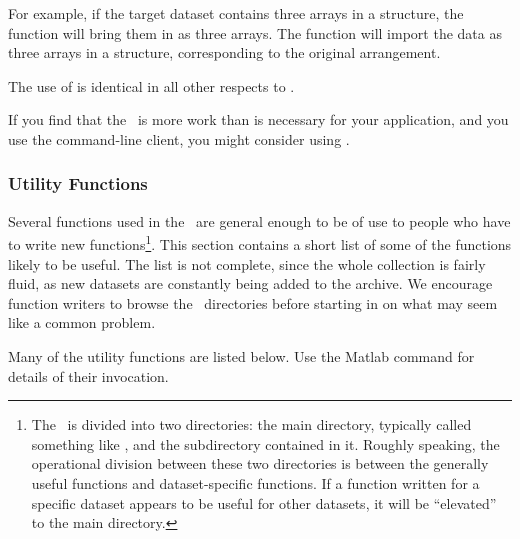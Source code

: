 For example, if the target dataset contains three arrays in a
structure, the  function will bring them in as three
arrays.  The  function will import the data as three
arrays in a structure, corresponding to the original arrangement.

The use of  is identical in all other respects to
.

If you find that the \GUI\ is more work than is necessary for your
application, and you use the command-line client, you might consider
using .


\subsubsection{Utility Functions}

Several functions used in the \GUI\ are general enough to be of use to
people who have to write new  functions\footnote{The \GUI\ 
  is divided into two directories: the main directory, typically
  called something like \lit{ml-toolbox}, and the \lit{DATASETS}
  subdirectory contained in it.  Roughly speaking, the operational
  division between these two directories is between the generally
  useful functions and dataset-specific functions.  If a function
  written for a specific dataset appears to be useful for other
  datasets, it will be ``elevated'' to the main directory.}.  This
section contains a short list of some of the functions likely to be
useful.  The list is not complete, since the whole collection is
fairly fluid, as new datasets are constantly being added to the
archive.  We encourage function writers to browse the \GUI\ 
directories before starting in on what may seem like a common problem.

Many of the utility functions are listed below.  Use the Matlab
 command for details of their invocation.

